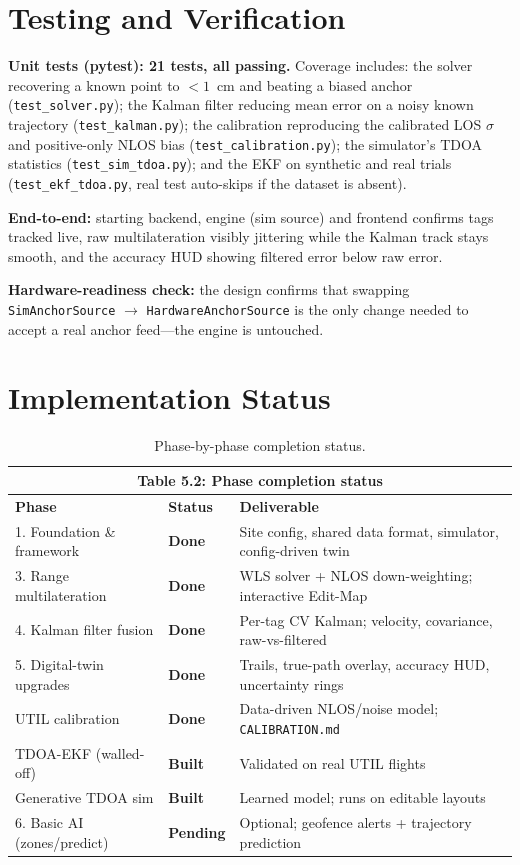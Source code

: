 \documentclass[a4paper,12pt,onecolumn]{report}
\begin{document}
\section{Testing and Verification}
\textbf{Unit tests (pytest): 21 tests, all passing.} Coverage includes: the
solver recovering a known point to $<1$~cm and beating a biased anchor
(\texttt{test\_solver.py}); the Kalman filter reducing mean error on a noisy
known trajectory (\texttt{test\_kalman.py}); the calibration reproducing the
calibrated LOS $\sigma$ and positive-only NLOS bias (\texttt{test\_calibration.py});
the simulator's TDOA statistics (\texttt{test\_sim\_tdoa.py}); and the EKF on
synthetic and real trials (\texttt{test\_ekf\_tdoa.py}, real test auto-skips if
the dataset is absent).

\textbf{End-to-end:} starting backend, engine (sim source) and frontend confirms
tags tracked live, raw multilateration visibly jittering while the Kalman track
stays smooth, and the accuracy HUD showing filtered error below raw error.

\textbf{Hardware-readiness check:} the design confirms that swapping
\texttt{SimAnchorSource} $\rightarrow$ \texttt{HardwareAnchorSource} is the only
change needed to accept a real anchor feed---the engine is untouched.

\section{Implementation Status}
\begin{table}[H]
\begin{center}
\begin{tabular}{ | l | l | p{6.5cm} | }
\hline
\multicolumn{3}{|c|}{\textbf{Table 5.2: Phase completion status}}\\
\hline
\textbf{Phase} & \textbf{Status} & \textbf{Deliverable}\\ \hline
1. Foundation \& framework & \textbf{Done} & Site config, shared data format, simulator, config-driven twin \\ \hline
3. Range multilateration & \textbf{Done} & WLS solver + NLOS down-weighting; interactive Edit-Map \\ \hline
4. Kalman filter fusion & \textbf{Done} & Per-tag CV Kalman; velocity, covariance, raw-vs-filtered \\ \hline
5. Digital-twin upgrades & \textbf{Done} & Trails, true-path overlay, accuracy HUD, uncertainty rings \\ \hline
UTIL calibration & \textbf{Done} & Data-driven NLOS/noise model; \texttt{CALIBRATION.md} \\ \hline
TDOA-EKF (walled-off) & \textbf{Built} & Validated on real UTIL flights \\ \hline
Generative TDOA sim & \textbf{Built} & Learned model; runs on editable layouts \\ \hline
6. Basic AI (zones/predict) & \textbf{Pending} & Optional; geofence alerts + trajectory prediction \\
\hline
\end{tabular}
\caption{Phase-by-phase completion status.}
\label{tab:status}
\end{center}
\end{table}
\end{document}
